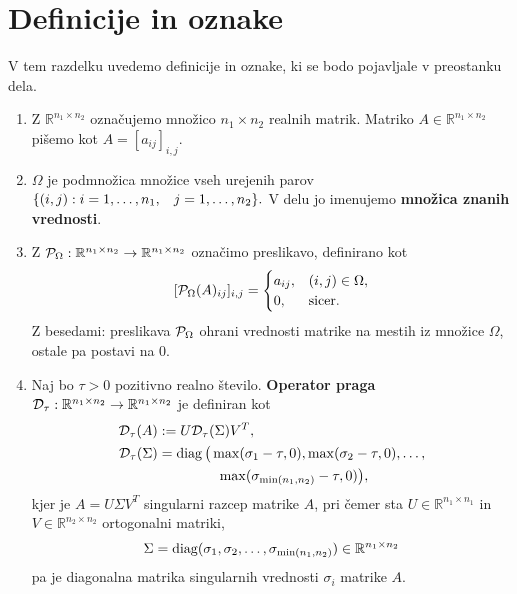 \section{Definicije in oznake} \label{2607-1502}
V tem razdelku uvedemo definicije in oznake, ki se bodo pojavljale v preostanku dela.
\begin{enumerate}
  \item Z $\mathbb{R}^{n_1\times n_2}$ označujemo množico $n_1\times n_2$ realnih matrik. Matriko $A\in \mathbb{R}^{n_1\times n_2}$ pišemo kot $A=[a_{ij}]_{i,j}$.
  \item $\Omega$ je podmnožica množice vseh urejenih parov $\{ (i, j) : i = 1, \hdots , n_1, \hspace{0.3cm} j = 1, \hdots, n_2 \}.$ V delu jo imenujemo \textbf{množica znanih vrednosti}.
  \item
        Z $\mathcal{P}_\Omega:\mathbb{R}^{n_1\times n_2}\to \mathbb{R}^{n_1\times n_2}$
        označimo preslikavo, definirano kot
        \[ [\mathcal{P}_\Omega(A)_{ij}]_{i,j} = \begin{cases}
            a_{ij}, & (i, j) \in \Omega, \\
            0,      & \text{sicer}.
          \end{cases}
        \]
        Z besedami: preslikava $\mathcal{P}_\Omega$ ohrani vrednosti matrike na mestih iz množice $\Omega$, ostale pa postavi na 0.
  \item Naj bo $\tau > 0$ pozitivno realno število.
        \textbf{Operator praga} \cite{CCS} $\mathcal{D}_\tau: \mathbb{R}^{n_1 \times n_2} \rightarrow \mathbb{R}^{n_1 \times n_2}$ je definiran kot
        \begin{align}
          \label{1007-1959}
          \begin{split}
            \mathcal{D}_\tau(A) &:= U \mathcal{D}_\tau(\Sigma) V^T, \\ \mathcal{D}_\tau(\Sigma) &= \operatorname{diag}\big(\max(\sigma_1 - \tau, 0),
            \max(\sigma_2-\tau,0),\ldots,\\
            &\hspace{1.5cm}
            \max(\sigma_{\min(n_1,n_2)}-\tau,0)\big),
          \end{split}
        \end{align}
        kjer je $A=U\Sigma V^T$
        singularni razcep matrike $A$, pri čemer sta $U\in \mathbb{R}^{n_1\times n_1}$
        in $V\in \mathbb R^{n_2\times n_2}$ ortogonalni matriki,
        $$\Sigma=\operatorname{diag}(\sigma_1,\sigma_2,\ldots,\sigma_{\min(n_1,n_2)})\in \mathbb R^{n_1\times n_2}$$ pa je diagonalna matrika singularnih vrednosti $\sigma_i$ matrike $A$.

\end{enumerate}
